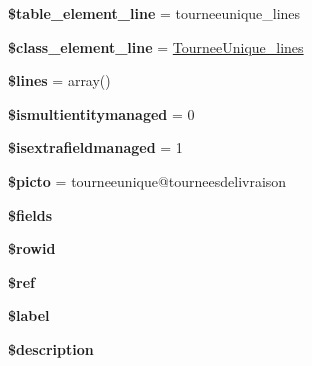 \begin{DoxyCompactItemize}
\item 
\mbox{\label{classTourneeUnique_af603418e2c19c6450e7340769f8d2ea8}} 
{\bfseries \$table\+\_\+element\+\_\+line} = \textquotesingle{}tourneeunique\+\_\+lines\textquotesingle{}
\item 
\mbox{\label{classTourneeUnique_a66d0449e4f34fd70909135432ab29216}} 
{\bfseries \$class\+\_\+element\+\_\+line} = \textquotesingle{}\hyperlink{classTourneeUnique__lines}{Tournee\+Unique\+\_\+lines}\textquotesingle{}
\item 
\mbox{\label{classTourneeUnique_a314827575aa01c7b33ca11c6f30c3c0f}} 
{\bfseries \$lines} = array()
\item 
\mbox{\label{classTourneeUnique_af90a904983a6a322cacb1e23d98ba4ee}} 
{\bfseries \$ismultientitymanaged} = 0
\item 
\mbox{\label{classTourneeUnique_a6478a19e6561cb4920479b32c1551199}} 
{\bfseries \$isextrafieldmanaged} = 1
\item 
\mbox{\label{classTourneeUnique_ab801aaff38840c27d1f019f0b55b25d1}} 
{\bfseries \$picto} = \textquotesingle{}tourneeunique@tourneesdelivraison\textquotesingle{}
\item 
{\bfseries \$fields}
\item 
\mbox{\label{classTourneeUnique_a027d39144b2d219d3b85bed44b453aec}} 
{\bfseries \$rowid}
\item 
\mbox{\label{classTourneeUnique_a3fcac2d376af8a8169d0cfb733c3f489}} 
{\bfseries \$ref}
\item 
\mbox{\label{classTourneeUnique_a1ca723af38a524d21aded067cc678325}} 
{\bfseries \$label}
\item 
\mbox{\label{classTourneeUnique_af4f0432fe211eca90bc84cb6d7e8b9df}} 
{\bfseries \$description}
\item 
\mbox{\label{classTourneeUnique_a1b3202a7913e1cf87290df5fa510fdee}} 

\end{DoxyCompactItemize}
